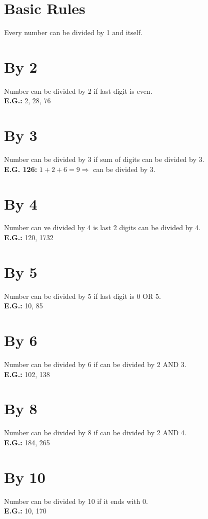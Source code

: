 \documentclass[a4paper]{article}
\begin{document}
\begin{Large}

\section*{Basic Rules}

Every number can be divided by 1 and itself.

\section*{By 2}

Number can be divided by 2 if last digit is even. \\[0.125cm]
\textbf{E.G.:} 2, 28, 76

\section*{By 3}

Number can be divided by 3 if sum of digits can be divided by 3. \\[0.125cm]
\textbf{E.G. 126:} $1 + 2 + 6 = 9 \Rightarrow$ can be divided by 3.

\section*{By 4}

Number can ve divided by 4 is last 2 digits can be divided by 4. \\[0.125cm]
\textbf{E.G.:} 120, 1732

\section*{By 5}

Number can be divided by 5 if last digit is 0 OR 5. \\[0.125cm]
\textbf{E.G.:} 10, 85

\section*{By 6}

Number can be divided by 6 if can be divided by 2 AND 3. \\[0.125cm]
\textbf{E.G.:} 102, 138

\section*{By 8}

Number can be divided by 8 if can be divided by 2 AND 4. \\[0.125cm]
\textbf{E.G.:} 184, 265

\section*{By 10}

Number can be divided by 10 if it ends with 0. \\[0.125cm]
\textbf{E.G.:} 10, 170

\end{Large}
\end{document}
